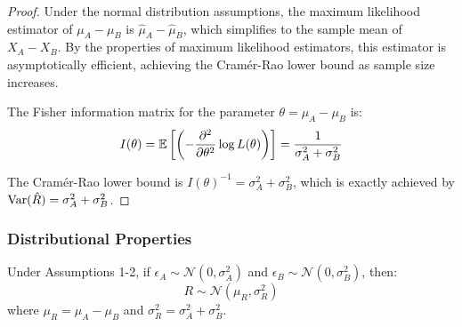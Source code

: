 \begin{proof}
Under the normal distribution assumptions, the maximum likelihood estimator of $\mu_A - \mu_B$ is $\hat{\mu}_A - \hat{\mu}_B$, which simplifies to the sample mean of $X_A - X_B$. By the properties of maximum likelihood estimators, this estimator is asymptotically efficient, achieving the Cramér-Rao lower bound as sample size increases.

The Fisher information matrix for the parameter $\theta = \mu_A - \mu_B$ is:
\begin{equation}
I(\theta) = \operatorname{\mathbb{E}}\left[\left(-\frac{\partial^2}{\partial \theta^2} \log L(\theta)\right)\right] = \frac{1}{\sigma_A^2 + \sigma_B^2}
\end{equation}

The Cramér-Rao lower bound is $I(\theta)^{-1} = \sigma_A^2 + \sigma_B^2$, which is exactly achieved by $\operatorname{Var}(\hat{R}) = \sigma_A^2 + \sigma_B^2$.
\end{proof}

\subsubsection{Distributional Properties}

\begin{theorem}
\label{thm:normal_distribution}
Under Assumptions 1-2, if $\epsilon_A \sim \mathcal{N}(0, \sigma_A^2)$ and $\epsilon_B \sim \mathcal{N}(0, \sigma_B^2)$, then:
\begin{equation}
R \sim \mathcal{N}(\mu_R, \sigma_R^2)
\end{equation}
where $\mu_R = \mu_A - \mu_B$ and $\sigma_R^2 = \sigma_A^2 + \sigma_B^2$.
\end{theorem}

